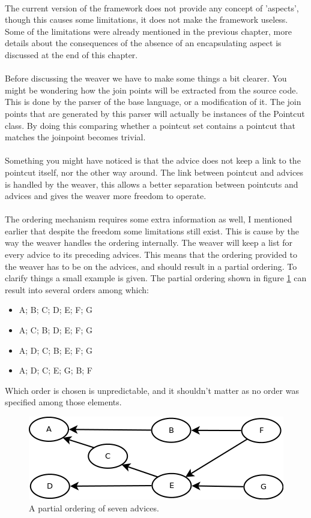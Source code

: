 \documentclass[a4paper]{report}
\begin{document}
\\
The current version of the framework does not provide any concept of 'aspects', though this causes some limitations, it does not make the framework useless. Some of the limitations were already mentioned in the previous chapter, more details about the consequences of the absence of an encapsulating aspect is discussed at the end of this chapter.\\
\\
Before discussing the weaver we have to make some things a bit clearer. You might be wondering how the join points will be extracted from the source code. This is done by the parser of the base language, or a modification of it. The join points that are generated by this parser will actually be instances of the Pointcut class. By doing this comparing whether a pointcut set contains a pointcut that matches the joinpoint becomes trivial.\\
\\
Something you might have noticed is that the advice does not keep a link to the pointcut itself, nor the other way around. The link between pointcut and advices is handled by the weaver, this allows a better separation between pointcuts and advices and gives the weaver more freedom to operate.\\
\\
The ordering mechanism requires some extra information as well, I mentioned earlier that despite the freedom some limitations still exist. This is cause by the way the weaver handles the ordering internally. The weaver will keep a list for every advice to its preceding advices. This means that the ordering provided to the weaver has to be on the advices, and should result in a partial ordering. To clarify things a small example is given. The partial ordering shown in figure \ref{fig:Order} can result into several orders among which:
\begin{itemize}
\item A; B; C; D; E; F; G
\item A; C; B; D; E; F; G
\item A; D; C; B; E; F; G
\item A; D; C; E; G; B; F
\end{itemize}
Which order is chosen is unpredictable, and it shouldn't matter as no order was specified among those elements.\\
\begin{figure}[h!]
\centering
\includegraphics[scale=0.6]{images/AOF/Order.png}
\caption{A partial ordering of seven advices.}
\label{fig:Order}
\end{figure}\\
\end{document}
